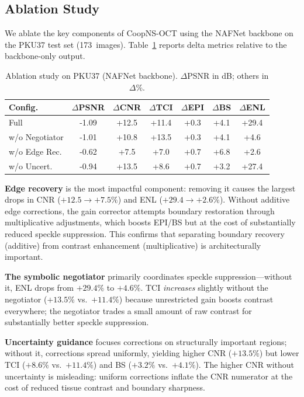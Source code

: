 \documentclass[journal,twoside,web]{ieeecolor}
\begin{document}
\subsection{Ablation Study}
\label{sec:ablation}

We ablate the key components of CoopNS-OCT using the NAFNet backbone on the PKU37 test set (173~images). Table~\ref{tab:ablation} reports delta metrics relative to the backbone-only output.

\begin{table}[t]
\centering
\caption{Ablation study on PKU37 (NAFNet backbone). $\Delta$PSNR in dB; others in $\Delta\%$.}
\label{tab:ablation}
\setlength{\tabcolsep}{2.5pt}
\footnotesize
\begin{tabular}{lcccccc}
\toprule
Config. & $\Delta$PSNR & $\Delta$CNR & $\Delta$TCI & $\Delta$EPI & $\Delta$BS & $\Delta$ENL \\
\midrule
Full & -1.09 & +12.5 & +11.4 & +0.3 & +4.1 & +29.4 \\
w/o Negotiator & -1.01 & +10.8 & +13.5 & +0.3 & +4.1 & +4.6 \\
w/o Edge Rec. & -0.62 & +7.5 & +7.0 & +0.7 & +6.8 & +2.6 \\
w/o Uncert. & -0.94 & +13.5 & +8.6 & +0.7 & +3.2 & +27.4 \\
\bottomrule
\end{tabular}
\end{table}

\textbf{Edge recovery} is the most impactful component: removing it causes the largest drops in CNR ($+12.5 \to +7.5\%$) and ENL ($+29.4 \to +2.6\%$). Without additive edge corrections, the gain corrector attempts boundary restoration through multiplicative adjustments, which boosts EPI/BS but at the cost of substantially reduced speckle suppression. This confirms that separating boundary recovery (additive) from contrast enhancement (multiplicative) is architecturally important.

\textbf{The symbolic negotiator} primarily coordinates speckle suppression---without it, ENL drops from $+29.4\%$ to $+4.6\%$. TCI \emph{increases} slightly without the negotiator ($+13.5\%$ vs.\ $+11.4\%$) because unrestricted gain boosts contrast everywhere; the negotiator trades a small amount of raw contrast for substantially better speckle suppression.

\textbf{Uncertainty guidance} focuses corrections on structurally important regions; without it, corrections spread uniformly, yielding higher CNR ($+13.5\%$) but lower TCI ($+8.6\%$ vs.\ $+11.4\%$) and BS ($+3.2\%$ vs.\ $+4.1\%$). The higher CNR without uncertainty is misleading: uniform corrections inflate the CNR numerator at the cost of reduced tissue contrast and boundary sharpness.
\end{document}

